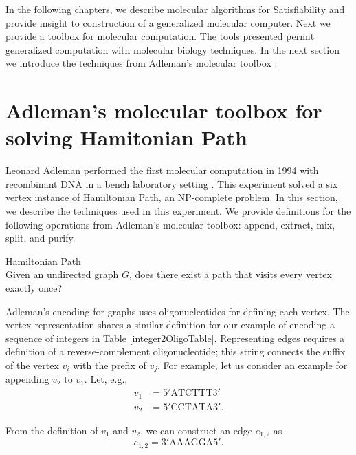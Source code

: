 In the following chapters, we describe molecular algorithms for {\sc Satisfiability} and provide insight to construction of a generalized molecular computer.  Next we provide a toolbox for molecular computation.  The tools presented permit generalized computation with molecular biology techniques.  In the next section we introduce the techniques from Adleman's molecular toolbox \cite{Adleman:1994:MCS:189441.189442}.

\section{Adleman's molecular toolbox for solving {\sc Hamitonian Path}}
	
Leonard Adleman performed the first molecular computation in 1994 with recombinant DNA in a bench laboratory setting \cite{Adleman:1994:MCS:189441.189442}.  This experiment solved a six vertex instance of {\sc Hamiltonian Path}, an \textsf{NP-complete} problem.  In this section, we describe the techniques used in this experiment. We provide definitions for the following operations from Adleman's molecular toolbox: append, extract, mix, split, and purify.

\begin{definition}
{\sc Hamiltonian Path} \\
Given an undirected graph $G$, does there exist a path that visits every vertex exactly once?

\end{definition}

%


Adleman's encoding for graphs uses oligonucleotides for defining each vertex.  The vertex representation shares a similar definition for our example of encoding a sequence of integers in Table \ref{integer2OligoTable}.  Representing edges requires a definition of a reverse-complement oligonucleotide; this string connects the suffix of the vertex $v_i$ with the prefix of $v_j$.  For example, let us consider an example for appending $v_2$ to $v_1$.  Let, e.g.,
\begin{align*}
 v_1 &= 5'\text{ATCTTT}3' \\
 v_2 &= 5'\text{CCTATA}3'.
\end{align*}

\noindent From the definition of $v_1$ and $v_2$, we can construct an edge $e_{1,2}$ as
\[
e_{1,2} = 3'\text{AAAGGA}5'.
\]

